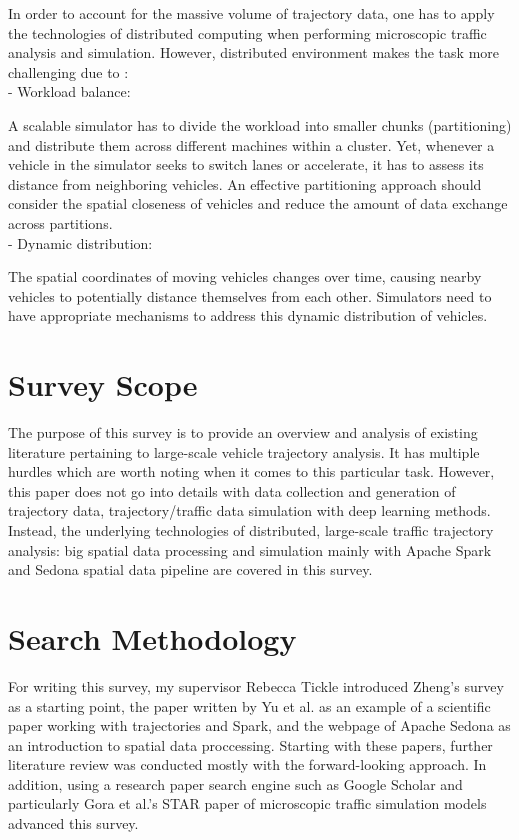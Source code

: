 \documentclass[11pt]{uonthesis}
\begin{document}
In order to account for the massive volume of trajectory data, one has to apply the technologies of distributed computing when performing microscopic traffic analysis and simulation. However, distributed environment makes the task more challenging due to \cite{yu2020dissecting}:
\\
\noindent- Workload balance:

A scalable simulator has to divide the workload into smaller chunks (partitioning) and distribute them across different machines within a cluster. Yet, whenever a vehicle in the simulator seeks to switch lanes or accelerate, it has to assess its distance from neighboring vehicles. An effective partitioning approach should consider the spatial closeness of vehicles and reduce the amount of data exchange across partitions.
\\
\noindent- Dynamic distribution:

The spatial coordinates of moving vehicles changes over time, causing nearby vehicles to potentially distance themselves from each other. Simulators need to have appropriate mechanisms to address this dynamic distribution of vehicles. 

\section{Survey Scope}
The purpose of this survey is to provide an overview and analysis of existing literature pertaining to large-scale vehicle trajectory analysis. It has multiple hurdles which are worth noting when it comes to this particular task. However, this paper does not go into details with data collection and generation of trajectory data, trajectory/traffic data simulation with deep learning methods. Instead, the underlying technologies of distributed, large-scale traffic trajectory analysis: big spatial data processing and simulation mainly with Apache Spark and Sedona spatial data pipeline are covered in this survey.

\section{Search Methodology} 

For writing this survey, my supervisor Rebecca Tickle introduced Zheng's survey\cite{zheng2015trajectory} as a starting point, the paper written by Yu et al.\cite{yu2020dissecting} as an example of a scientific paper working with trajectories and Spark, and the webpage of Apache Sedona\cite{sedona} as an introduction to spatial data proccessing. Starting with these papers, further literature review was conducted mostly with the forward-looking approach. In addition, using a research paper search engine such as Google Scholar and particularly Gora et al.'s STAR paper of microscopic traffic simulation models\cite{gora2020microscopic} advanced this survey.
\end{document}
